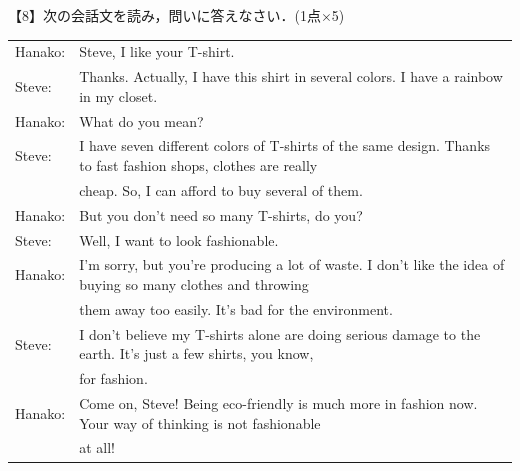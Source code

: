 \newpage
\noindent 【8】次の会話文を読み，問いに答えなさい．(1点$\times$5)\medskip\\
\begin{tabular}{l l}
  Hanako:& Steve, I like your T-shirt.\\
  Steve:& Thanks. Actually, I have this shirt in several colors. I have a rainbow in my closet.\\
  Hanako:& What do you mean?\\
  Steve:& I have seven different colors of T-shirts of the same design. Thanks to fast fashion shops, clothes are really\\
  &cheap. So, I can afford to buy several of them.\\
  Hanako:& But you don't need so many T-shirts, do you?\\
  Steve:& Well, I want to look fashionable.\\
  Hanako:& I'm sorry, but you're producing a lot of waste. I don't like the idea of buying so many clothes and throwing\\
  &them away too easily. It's bad for the environment.\\
  Steve:& I don't believe my T-shirts alone are doing serious damage to the earth. It's just a few shirts, you know,\\
  &for fashion.\\
  Hanako:& Come on, Steve! Being eco-friendly is much more in fashion now. Your way of thinking is not fashionable\\
  &at all! \\
\end{tabular}
\medskip\par
